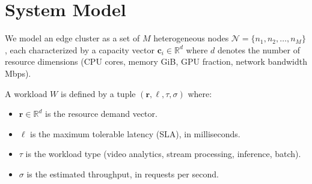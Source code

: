 \section{System Model}

We model an edge cluster as a set of \(M\) heterogeneous nodes
\(\mathcal{N} = \{n_1, n_2, \ldots, n_M\}\),
each characterized by a capacity vector
\(\mathbf{c}_i \in \mathbb{R}^d\) where \(d\) denotes the number of resource dimensions
(CPU cores, memory GiB, GPU fraction, network bandwidth Mbps).

\vspace{6pt}
A workload \(W\) is defined by a tuple
\((\mathbf{r}, \ell, \tau, \sigma)\) where:
\begin{itemize}[leftmargin=2em,itemsep=2pt]
    \item \(\mathbf{r} \in \mathbb{R}^d\) is the resource demand vector.
    \item \(\ell\) is the maximum tolerable latency (SLA), in milliseconds.
    \item \(\tau\) is the workload type (video analytics, stream processing, inference, batch).
    \item \(\sigma\) is the estimated throughput, in requests per second.
\end{itemize}
